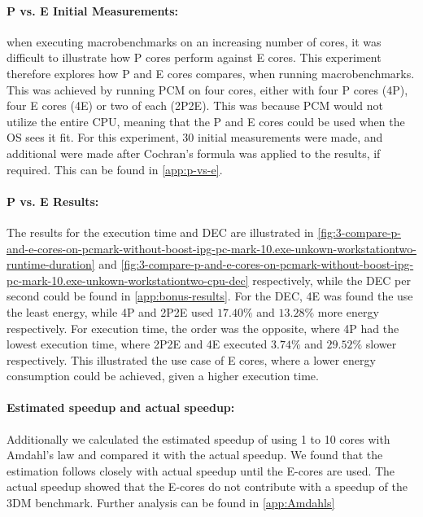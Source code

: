 

\paragraph{P vs. E Initial Measurements:} when executing macrobenchmarks on an increasing number of cores, it was difficult to illustrate how P cores perform against E cores. This experiment therefore explores how P and E cores compares, when running macrobenchmarks. This was achieved by running PCM on four cores, either with four P cores (4P), four E cores (4E) or two of each (2P2E). This was because PCM would not utilize the entire CPU, meaning that the P and E cores could be used when the OS sees it fit. For this experiment, $30$ initial measurements were made, and additional were made after Cochran's formula was applied to the results, if required. This can be found in \cref{app:p-vs-e}.



\paragraph{P vs. E Results:} The results for the execution time and DEC are illustrated in \cref{fig:3-compare-p-and-e-cores-on-pcmark-without-boost-ipg-pc-mark-10.exe-unkown-workstationtwo-runtime-duration} and  \cref{fig:3-compare-p-and-e-cores-on-pcmark-without-boost-ipg-pc-mark-10.exe-unkown-workstationtwo-cpu-dec} respectively, while the DEC per second could be found in \cref{app:bonus-results}. For the DEC, 4E was found the use the least energy, while 4P and 2P2E used $17.40\%$ and $13.28\%$ more energy respectively. For execution time, the order was the opposite, where 4P had the lowest execution time, where 2P2E and 4E executed $3.74\%$ and $29.52\%$ slower respectively. This illustrated the use case of E cores, where a lower energy consumption could be achieved, given a higher execution time.  



\paragraph{Estimated speedup and actual speedup:}
Additionally we calculated the estimated speedup of using 1 to 10 cores with Amdahl's law and compared it with the actual speedup. We found that the estimation follows closely with actual speedup until the E-cores are used. The actual speedup showed that the E-cores do not contribute with a speedup of the 3DM benchmark. Further analysis can be found in \cref{app:Amdahls}


